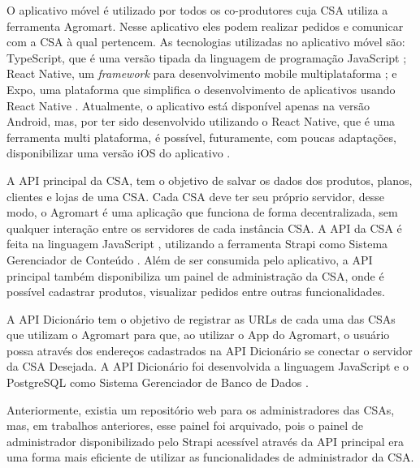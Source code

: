 O aplicativo móvel é utilizado por todos os co-produtores cuja CSA utiliza a ferramenta Agromart. Nesse aplicativo eles podem realizar pedidos e comunicar com a CSA à qual pertencem. As tecnologias utilizadas no aplicativo móvel são: TypeScript, que é uma versão tipada da linguagem de programação JavaScript \cite{typescript2022}; React Native, um \textit{framework} para desenvolvimento mobile multiplataforma \cite{reactnative2024}; e Expo, uma plataforma que simplifica o desenvolvimento de aplicativos usando React Native \cite{expo2018}. Atualmente, o aplicativo está disponível apenas na versão Android, mas, por ter sido desenvolvido utilizando o React Native, que é uma ferramenta multi plataforma, é possível, futuramente, com poucas adaptações, disponibilizar uma versão iOS do aplicativo \cite{android2024}.

A API principal da CSA, tem o objetivo de salvar os dados dos produtos, planos, clientes e lojas de uma CSA. Cada CSA deve ter seu próprio servidor, desse modo, o Agromart é uma aplicação que funciona de forma decentralizada, sem qualquer interação entre os servidores de cada instância CSA. A API da CSA é feita na linguagem JavaScript \cite{javascript2024}, utilizando a ferramenta Strapi como Sistema Gerenciador de Conteúdo \cite{strapi2023}.
Além de ser consumida pelo aplicativo, a API principal também disponibiliza um painel de administração da CSA, onde é possível cadastrar produtos, visualizar pedidos entre outras funcionalidades.

A API Dicionário tem o objetivo de registrar as URLs de cada uma das CSAs que utilizam o Agromart para que, ao utilizar o App do Agromart, o usuário possa através dos endereços cadastrados na API Dicionário se conectar o servidor da CSA Desejada. A API Dicionário foi desenvolvida a linguagem JavaScript e o PostgreSQL como Sistema Gerenciador de Banco de Dados \cite{postgresql2024}.

Anteriormente, existia um repositório web para os administradores das CSAs, mas, em trabalhos anteriores, esse painel foi arquivado, pois o painel de administrador disponibilizado pelo Strapi acessível através da API principal era uma forma mais eficiente de utilizar as funcionalidades de administrador da CSA.

